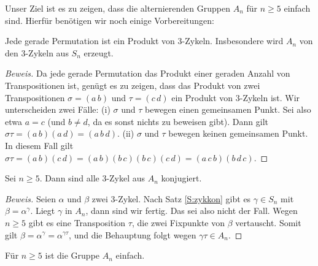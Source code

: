 \documentclass[12pt,a4paper,twoside]{article}
\begin{document}
Unser Ziel ist es zu zeigen, dass die alternierenden Gruppen $A_n$ f\"ur
$n\ge5$ einfach sind. Hierf\"ur ben\"otigen wir noch einige Vorbereitungen:
\begin{Satz}\label{S:Anerz}
  Jede gerade Permutation ist ein Produkt von $3$-Zykeln. Insbesondere wird
  $A_n$ von den $3$-Zykeln aus $S_n$ erzeugt.
\end{Satz}
\begin{proof}[Beweis]
  Da jede gerade Permutation das Produkt einer geraden Anzahl von
  Transpositionen ist, gen\"ugt es zu zeigen, dass das Produkt von zwei
  Transpositionen $\sigma=(a\,b)$ und $\tau=(c\,d)$ ein Produkt von $3$-Zykeln
  ist. Wir unterscheiden zwei F\"alle: (i) $\sigma$ und $\tau$ bewegen einen
  gemeinsamen Punkt. Sei also etwa $a=c$ (und $b\ne d$, da es sonst nichts zu
  beweisen gibt). Dann gilt $\sigma\tau=(a\,b)(a\,d)=(a\,b\,d)$. (ii) $\sigma$
  und $\tau$ bewegen keinen gemeinsamen Punkt. In diesem Fall gilt
  $\sigma\tau=(a\,b)(c\,d)=(a\,b)(b\,c)(b\,c)(c\,d)=(a\,c\,b)(b\,d\,c)$.
\end{proof}
\begin{Lemma}
  Sei $n\ge5$. Dann sind alle $3$-Zykel aus $A_n$ konjugiert.
\end{Lemma}
\begin{proof}[Beweis]
  Seien $\alpha$ und $\beta$ zwei $3$-Zykel. Nach Satz \ref{S:zykkon} gibt es
  $\gamma\in S_n$ mit $\beta=\alpha^\gamma$. Liegt $\gamma$ in $A_n$, dann
  sind wir fertig. Das sei also nicht der Fall. Wegen $n\ge5$ gibt es eine
  Transposition $\tau$, die zwei Fixpunkte von $\beta$ vertauscht. Somit gilt
  $\beta=\alpha^\gamma=\alpha^{\gamma\tau}$, und die Behauptung folgt wegen
  $\gamma\tau\in A_n$.
\end{proof}
\begin{Satz}
  F\"ur $n\ge5$ ist die Gruppe $A_n$ einfach.
\end{Satz}
\end{document}
